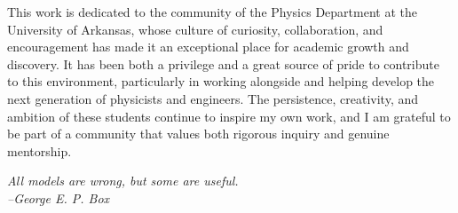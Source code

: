 %
\begin{frontmatter}

%
%
\makefrontmatter 
%
%   
%
%
%
%
\begin{dedication} 
  This work is dedicated to the community of the Physics Department at the University of Arkansas, whose culture of curiosity, collaboration, and encouragement has made it an exceptional place for academic growth and discovery. It has been both a privilege and a great source of pride to contribute to this environment, particularly in working alongside and helping develop the next generation of physicists and engineers. The persistence, creativity, and ambition of these students continue to inspire my own work, and I am grateful to be part of a community that values both rigorous inquiry and genuine mentorship.
\end{dedication}


%




%
%
\begin{epigraph} %
  \emph{All models are wrong, but some are useful.\\
  --George E. P. Box}\\
\end{epigraph}

% 



\end{frontmatter}
